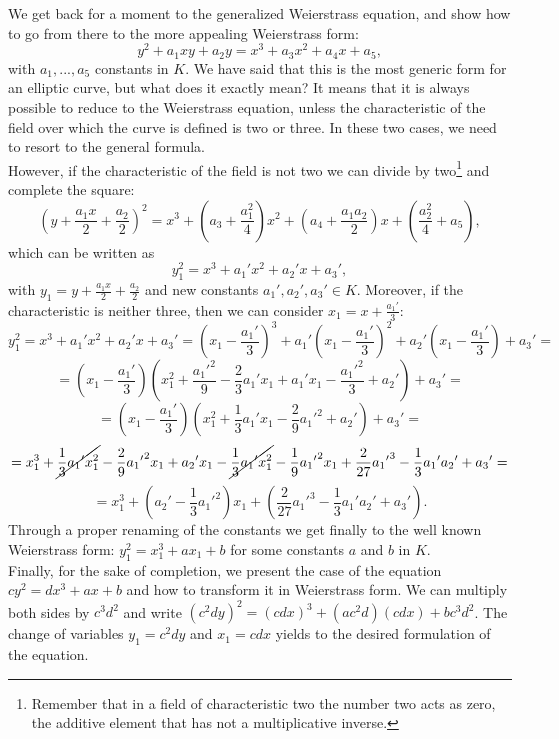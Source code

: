 \bigskip
\noindent
We get back for a moment to the generalized Weierstrass equation, and show how to go from there to the more appealing Weierstrass form:
$$y^2 + a_1xy + a_2y = x^3 + a_3x^2 + a_4x + a_5,$$ 
with $a_1,...,a_5$ constants in $K$. We have said that this is the most generic form for an elliptic curve, but what does it exactly mean? It means that it is always possible to reduce to the Weierstrass equation, unless the characteristic of the field over which the curve is defined is two or three. In these two cases, we need to resort to the general formula.
\\
However, if the characteristic of the field is not two we can divide by two\footnote{Remember that in a field of characteristic two the number two acts as zero, the additive element that has not a multiplicative inverse.} and complete the square: $$\left(y + \frac{a_1x}{2} + \frac{a_2}{2}\right)^2 = x^3 + \left(a_3 + \frac{a_1^2}{4}\right)x^2 + \left(a_4 + \frac{a_1a_2}{2}\right)x + \left(\frac{a_2^2}{4} + a_5\right),$$ which can be written as $$y_1^2 = x^3 + a_1{'}x^2 + a_2{'}x + a_3{'},$$ with $y_1 = y + \frac{a_1x}{2} + \frac{a_2}{2}$ and new constants $a_1{'}, a_2{'}, a_3{'} \in K$. Moreover, if the characteristic is neither three, then we can consider $x_1 = x + \frac{a_1{'}}{3}$:
$$y_1^2 = x^3 + a_1{'}x^2 + a_2{'}x + a_3{'} = \left(x_1 - \frac{a_1{'}}{3}\right)^3 + a_1{'}\left(x_1 - \frac{a_1{'}}{3}\right)^2 + a_2{'}\left(x_1 - \frac{a_1{'}}{3}\right) + a_3{'} = $$ $$= \left(x_1 - \frac{a_1{'}}{3}\right)\left(x_1^2 + \frac{a_1{'}^2}{9} -\frac{2}{3}a_1{'}x_1 + a_1{'}x_1 - \frac{a_1{'}^2}{3} + a_2{'}\right) + a_3{'} = $$ $$=\left(x_1 - \frac{a_1{'}}{3}\right) \left(x_1^2 + \frac{1}{3}a_1{'}x_1 - 	\frac{2}{9}a_1{'}^2 + a_2{'}\right) + a_3{'} = $$ $$= x_1^3 + \cancel{\frac{1}{3}a_1{'}x_1^2} - \frac{2}{9}a_1{'}^2x_1 + a_2{'}x_1 - \cancel{\frac{1}{3}a_1{'}x_1^2} - \frac{1}{9}a_1{'}^2x_1 + \frac{2}{27}a_1{'}^3 - \frac{1}{3}a_1{'}a_2{'} + a_3{'} = $$ $$=x_1^3 + \left(a_2{'} - \frac{1}{3}a_1{'}^2\right)x_1 + \left(\frac{2}{27}a_1{'}^3 - \frac{1}{3}a_1{'}a_2{'} + a_3{'}\right).$$ 
Through a proper renaming of the constants we get finally to the well known Weierstrass form: $y_1^2 = x_1^3 + ax_1 + b$ for some constants $a$ and $b$ in $K$. 
\\
Finally, for the sake of completion, we present the case of the equation $cy^2 = dx^3 + ax + b$ and how to transform it in Weierstrass form. We can multiply both sides by $c^3d^2$ and write $(c^2dy)^2 = (cdx)^3 + (ac^2d)(cdx) + bc^3d^2$. The change of variables $y_1 = c^2dy$ and $x_1 = cdx$ yields to the desired formulation of the equation.

